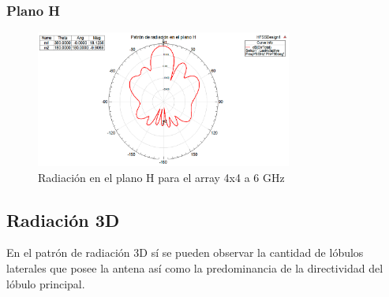 \subsubsection{Plano H}
\begin{figure}[H]
    \centering
        \includegraphics[width=0.75\textwidth]{archivos/analisis/4x42/5}
        \caption{Radiación en el plano H para el array 4x4 a 6 GHz}
        \label{fig:H4x42}
\end{figure}

\subsection{Radiación 3D}
\par En el patrón de radiación 3D sí se pueden observar la cantidad de lóbulos laterales que posee la antena así como la predominancia de la directividad del lóbulo principal.

